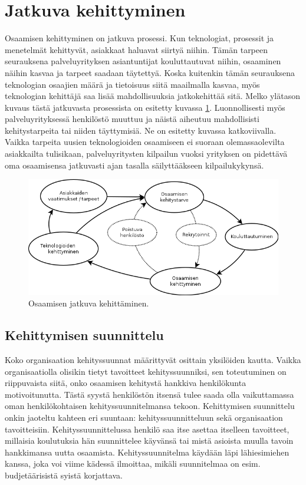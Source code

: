 \documentclass[a4paper,finnish,12pt]{article}
\begin{document}
\clearpage

\section{Jatkuva kehittyminen}

Osaamisen kehittyminen on jatkuva prosessi. Kun teknologiat, prosessit ja menetelmät kehittyvät, asiakkaat haluavat siirtyä niihin. Tämän tarpeen seurauksena palveluyrityksen asiantuntijat kouluttautuvat niihin, osaaminen näihin kasvaa ja tarpeet saadaan täytettyä. Koska kuitenkin tämän seurauksena teknologian osaajien määrä ja tietoisuus siitä maailmalla kasvaa, myös teknologian kehittäjä saa lisää mahdollisuuksia jatkokehittää sitä. Melko ylätason kuvaus tästä jatkuvasta prosessista on esitetty kuvassa \ref{fig:perusympyra}. Luonnollisesti myös palveluyrityksessä henkilöstö muuttuu ja näistä aiheutuu mahdollisisti kehitystarpeita tai niiden täyttymisiä. Ne on esitetty kuvassa katkoviivalla. Vaikka tarpeita uusien teknologioiden osaamiseen ei suoraan olemassaolevilta asiakkailta tulisikaan, palveluyritysten kilpailun vuoksi yrityksen on pidettävä oma osaamisensa jatkuvasti ajan tasalla säilyttääkseen kilpailukykynsä.

\begin{figure}[ht]
\centering
\includegraphics[scale=0.5]{knowledge_circle.png}
\caption{Osaamisen jatkuva kehittäminen.}
\label{fig:perusympyra}
\end{figure}

\subsection{Kehittymisen suunnittelu}

Koko organisaation kehityssuunnat määrittyvät osittain yksilöiden kautta. Vaikka organisaatiolla olisikin tietyt tavoitteet kehityssuunniksi, sen toteutuminen on riippuvaista siitä, onko osaamisen kehitystä hankkiva henkilökunta motivoitunutta. Tästä syystä henkilöstön itsensä tulee saada olla vaikuttamassa oman henkilökohtaisen kehityssuunnitelmansa tekoon. Kehittymisen suunnittelu onkin jaoteltu kahteen eri suuntaan: kehityssuunnitteluun sekä organisaation tavoitteisiin. Kehityssuunnittelussa henkilö saa itse asettaa itselleen tavoitteet, millaisia koulutuksia hän suunnittelee käyvänsä tai mistä asioista muulla tavoin hankkimansa uutta osaamista. Kehityssuunnitelma käydään läpi lähiesimiehen kanssa, joka voi viime kädessä ilmoittaa, mikäli suunnitelmaa on esim. budjetäärisistä syistä korjattava.
\end{document}
